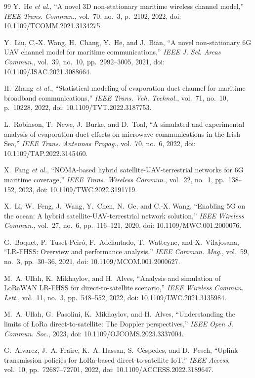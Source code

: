 \begin{thebibliography}{99}
 Y.~He \emph{et al.}, ``A novel 3D non-stationary maritime wireless channel model,'' \emph{IEEE Trans. Commun.}, vol.~70, no.~3, p.~2102, 2022, doi: 10.1109/TCOMM.2021.3134275.

 Y.~Liu, C.-X. Wang, H.~Chang, Y.~He, and J.~Bian, ``A novel non-stationary 6G UAV channel model for maritime communications,'' \emph{IEEE J. Sel. Areas Commun.}, vol.~39, no.~10, pp.~2992--3005, 2021, doi: 10.1109/JSAC.2021.3088664.

 H.~Zhang \emph{et al.}, ``Statistical modeling of evaporation duct channel for maritime broadband communications,'' \emph{IEEE Trans. Veh. Technol.}, vol.~71, no.~10, p.~10228, 2022, doi: 10.1109/TVT.2022.3187753.

 L.~Robinson, T.~Newe, J.~Burke, and D.~Toal, ``A simulated and experimental analysis of evaporation duct effects on microwave communications in the Irish Sea,'' \emph{IEEE Trans. Antennas Propag.}, vol.~70, no.~6, 2022, doi: 10.1109/TAP.2022.3145460.

 X.~Fang \emph{et al.}, ``NOMA-based hybrid satellite-UAV-terrestrial networks for 6G maritime coverage,'' \emph{IEEE Trans. Wireless Commun.}, vol.~22, no.~1, pp.~138--152, 2023, doi: 10.1109/TWC.2022.3191719.

 X.~Li, W.~Feng, J.~Wang, Y.~Chen, N.~Ge, and C.-X. Wang, ``Enabling 5G on the ocean: A hybrid satellite-UAV-terrestrial network solution,'' \emph{IEEE Wireless Commun.}, vol.~27, no.~6, pp.~116--121, 2020, doi: 10.1109/MWC.001.2000076.

 G.~Boquet, P.~Tuset-Peir\'o, F.~Adelantado, T.~Watteyne, and X.~Vilajosana, ``LR-FHSS: Overview and performance analysis,'' \emph{IEEE Commun. Mag.}, vol.~59, no.~3, pp.~30--36, 2021, doi: 10.1109/MCOM.001.2000627.

 M.~A. Ullah, K.~Mikhaylov, and H.~Alves, ``Analysis and simulation of LoRaWAN LR-FHSS for direct-to-satellite scenario,'' \emph{IEEE Wireless Commun. Lett.}, vol.~11, no.~3, pp.~548--552, 2022, doi: 10.1109/LWC.2021.3135984.

 M.~A. Ullah, G.~Pasolini, K.~Mikhaylov, and H.~Alves, ``Understanding the limits of LoRa direct-to-satellite: The Doppler perspectives,'' \emph{IEEE Open J. Commun. Soc.}, 2023, doi: 10.1109/OJCOMS.2023.3337004.

 G.~Alvarez, J.~A. Fraire, K.~A. Hassan, S.~C\'espedes, and D.~Pesch, ``Uplink transmission policies for LoRa-based direct-to-satellite IoT,'' \emph{IEEE Access}, vol.~10, pp.~72687--72701, 2022, doi: 10.1109/ACCESS.2022.3189647.


\end{thebibliography}
